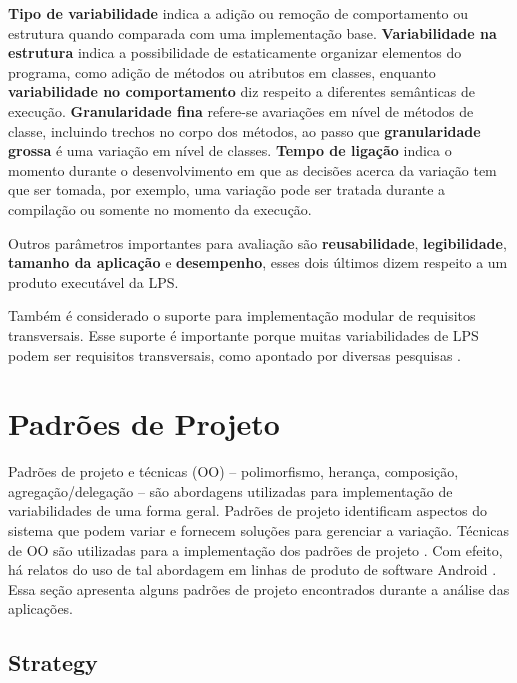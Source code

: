\textbf{Tipo de variabilidade} indica a adição ou remoção de comportamento ou
estrutura quando comparada com uma implementação base. \textbf{Variabilidade na estrutura}
indica a possibilidade de estaticamente organizar elementos do programa,
como adição de métodos ou atributos em classes, enquanto \textbf{variabilidade no comportamento}
diz respeito a diferentes semânticas de execução. \textbf{Granularidade fina}
refere-se avariações em nível de métodos de classe, incluindo trechos no corpo
dos métodos, ao passo que \textbf{granularidade grossa} é uma variação em nível
de classes. \textbf{Tempo de ligação} indica o momento durante o desenvolvimento
em que as decisões acerca da variação tem que ser tomada, por exemplo,
uma variação pode ser tratada durante a compilação ou somente no momento da execução.

Outros parâmetros importantes para avaliação são \textbf{reusabilidade}, \textbf{legibilidade},
\textbf{tamanho da aplicação} e \textbf{desempenho}, esses dois últimos dizem
respeito a um produto executável da LPS.

Também é considerado o suporte para implementação modular de requisitos transversais.
Esse suporte é importante porque muitas variabilidades de LPS podem ser requisitos
transversais, como apontado por diversas pesquisas \cite{Gacek2001} \cite{Batory2004}
\cite{Liu2006} \cite{Lopez2005} \cite{mezini2004}.

\section{Padrões de Projeto}
\label{sec:padroes-de-projeto}

Padrões de projeto \cite{Gamma}  e técnicas
 (OO)
-- polimorfismo, herança, composição, agregação/delegação -- são abordagens utilizadas
para implementação de variabilidades de uma forma geral. Padrões de projeto
identificam aspectos do sistema que podem variar e fornecem soluções para gerenciar
a variação. Técnicas de OO são utilizadas para a implementação dos padrões de
projeto \cite{Gacek2001}. Com efeito, há relatos do uso de tal abordagem em linhas
de produto de software Android \cite{Pavlic2013}. Essa seção apresenta alguns
padrões de projeto encontrados durante a análise das aplicações.

\subsection{Strategy}
\label{sec:strategy}

